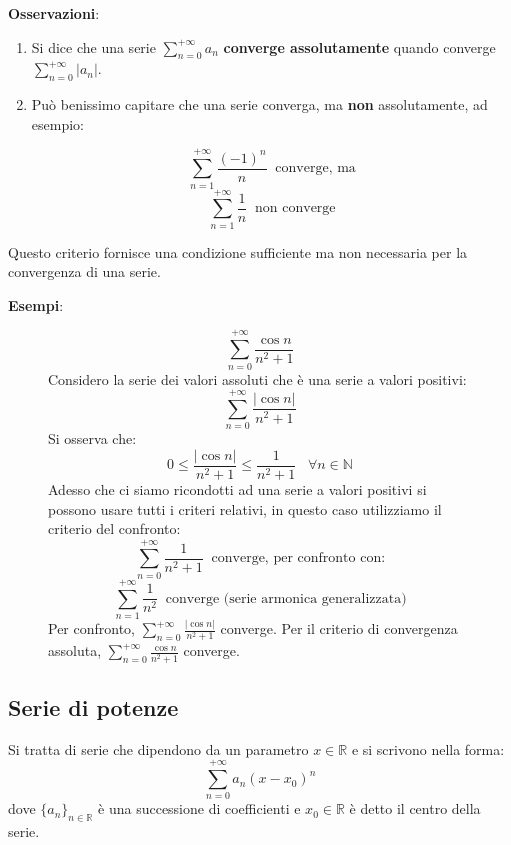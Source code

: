 \documentclass[a4paper]{article}
\theoremstyle{break}
\theoremstyle{break}
\theoremstyle{break}
\theoremstyle{break}
\begin{document}
\vspace{1em}
\textbf{Osservazioni}:
\begin{enumerate}
  \item Si dice che una serie \( \sum_{n=0}^{+\infty} a_n \) \textbf{converge assolutamente} quando converge
    \( \sum_{n=0}^{+\infty} |a_n| \).
  \item Può benissimo capitare che una serie converga, ma \textbf{non} assolutamente, ad esempio:
    \begin{figure}[H]
      \begin{example}
        \[
          \sum_{n=1}^{+\infty} \frac{(-1)^n}{n} \;\; \text{converge, ma} 
        \] 
        \[
          \sum_{n=1}^{+\infty} \frac{1}{n} \;\; \text{non converge}
        \] 
      \end{example}
    \end{figure}
\end{enumerate}
Questo criterio fornisce una condizione sufficiente ma non necessaria per la convergenza di una serie.

\vspace{1em}
\textbf{Esempi}:
\begin{figure}[H]
  \begin{example}
    \[
      \sum_{n=0}^{+\infty} \frac{\cos n}{n^2+1}
    \] 
    Considero la serie dei valori assoluti che è una serie a valori positivi:
    \[
      \sum_{n=0}^{+\infty} \frac{|\cos n|}{n^2+1}
    \]
    Si osserva che:
    \[
      0 \le \frac{|\cos n|}{n^2+1} \le \frac{1}{n^2+1} \;\;\; \forall n \in \mathbb{N}
    \] 
    Adesso che ci siamo ricondotti ad una serie a valori positivi si possono usare tutti i criteri relativi, in
    questo caso utilizziamo il criterio del confronto:
    \[
      \sum_{n=0}^{+\infty} \frac{1}{n^2+1} \;\; \text{converge, per confronto con:} 
    \] 
    \[
      \sum_{n=1}^{+\infty} \frac{1}{n^2} \;\; \text{converge (serie armonica generalizzata)}
    \] 
    Per confronto, \( \sum_{n=0}^{+\infty} \frac{|\cos n|}{n^2+1} \) converge. Per il criterio di convergenza
    assoluta, \( \sum_{n=0}^{+\infty} \frac{\cos n}{n^2+1} \) converge.
  \end{example}
\end{figure}

\subsection{Serie di potenze}
Si tratta di serie che dipendono da un parametro \( x \in \mathbb{R} \) e si scrivono nella forma:
\[
  \sum_{n=0}^{+\infty} a_n(x-x_0)^n
\] 
dove \( \{a_n\}_{n \in \mathbb{R}}  \) è una successione di coefficienti e \( x_0 \in \mathbb{R} \) è detto
il centro della serie.
\end{document}
